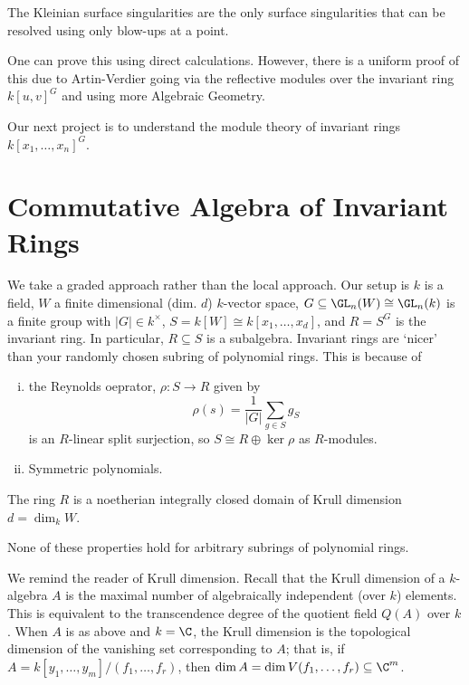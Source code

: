 \begin{thm}
The Kleinian surface singularities are the only surface singularities that can be resolved using only blow-ups at a point. 
\end{thm}


One can prove this using direct calculations. However, there is a uniform proof of this due to Artin-Verdier going via the reflective modules over the invariant ring $k[u,v]^G$ and using more Algebraic Geometry. 


Our next project is to understand the module theory of invariant rings $k[x_1,\ldots,x_n]^G$. 




\section{Commutative Algebra of Invariant Rings}


We take a graded approach rather than the local approach. Our setup is $k$ is a field, $W$ a finite dimensional (dim. $d$) $k$-vector space, $G \subseteq \GL_n(W) \cong \GL_n(k)$ is a finite group with $|G| \in k^\times$, $S=k[W] \cong k[x_1,\ldots,x_d]$, and $R= S^G$ is the invariant ring. In particular, $R \subseteq S$ is a subalgebra. Invariant rings are `nicer' than your randomly chosen subring of polynomial rings. This is because of
	\begin{enumerate}[(i)]
	\item the Reynolds oeprator, $\rho: S \to R$ given by
		\[
		\rho(s)= \dfrac{1}{|G|} \sum_{g \in S} g_S
		\]
	is an $R$-linear split surjection, so $S \cong R \oplus \ker \rho$ as $R$-modules.
	\item Symmetric polynomials. 
	\end{enumerate}


\begin{thm}[Noether, 1928]
The ring $R$ is a noetherian integrally closed domain of Krull dimension $d= \dim_k W$. 
\end{thm}


\begin{rem}
None of these properties hold for arbitrary subrings of polynomial rings. 
\end{rem}

 We remind the reader of Krull dimension. Recall that the Krull dimension of a $k$-algebra $A$ is the maximal number of algebraically independent (over $k$) elements. This is equivalent to the transcendence degree of the quotient field $Q(A)$ over $k$. When $A$ is as above and $k= \C$, the Krull dimension is the topological dimension of the vanishing set corresponding to $A$; that is, if $A= k[y_1,\ldots,y_m]/(f_1,\ldots,f_r)$, then $\dim A= \dim V(f_1,\ldots,f_r) \subseteq \C^m$. 
 
